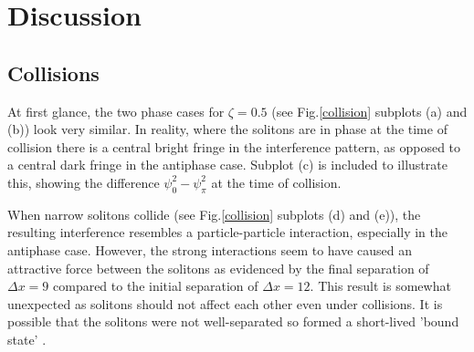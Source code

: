 \documentclass[10pt, twocolumn]{revtex4}    %
\begin{document}

\section{Discussion} 

\subsection{Collisions}

At first glance, the two phase cases for $\zeta=0.5$ (see Fig.\ref{collision} subplots (a) and (b)) look very similar. In reality, where the solitons are in phase at the time of collision there is a central bright fringe in the interference pattern, as opposed to a central dark fringe in the antiphase case. Subplot (c) is included to illustrate this, showing the difference $\psi_0^2 - \psi_{\pi}^2$ at the time of collision. 

When narrow solitons collide (see Fig.\ref{collision} subplots (d) and (e)), the resulting interference resembles a particle-particle interaction, especially in the antiphase case. However, the strong interactions seem to have caused an attractive force between the solitons as evidenced by the final separation of $\Delta x = 9$ compared to the initial separation of $\Delta x=12$. This result is somewhat unexpected as solitons should not affect each other even under collisions. It is possible that the solitons were not well-separated so formed a short-lived 'bound state' \cite{Bound}.

\end{document}
